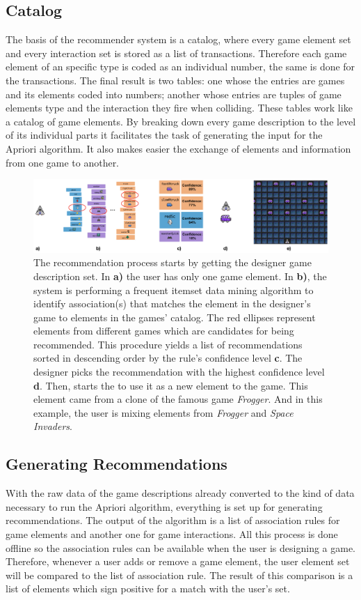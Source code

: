 \documentclass[letterpaper]{article} %
\begin{document}
\subsection{Catalog}
The basis of the recommender system is a catalog, where every game element set and every interaction set is stored as a list of transactions. Therefore each game element of an specific type is coded as an individual number, the same is done for the transactions. The final result is two tables: one whose the entries are games and its elements coded into numbers; another whose entries are tuples of game elements type and the interaction they fire when colliding. These tables work like a catalog of game elements. By breaking down every game description to the level of its individual parts it facilitates the task of generating the input for the Apriori algorithm. It also makes easier the exchange of elements and information from one game to another.

\begin{figure}[ht]
  \includegraphics[width=\linewidth]{process.png}
  \caption{The recommendation process starts by getting the designer game description set. In \textbf{a)} the user has only one game element. In \textbf{b)}, the system is performing a frequent itemset data mining algorithm to identify association(s) that matches the element in the designer's game to elements in the games' catalog. The red ellipses represent elements from different games which are candidates for being recommended. This procedure yields a list of recommendations sorted in descending order by the rule's confidence level \textbf{c}. The designer picks the recommendation with the highest confidence level \textbf{d}. Then, starts the to use it as a new element to the game. This element came from a clone of the famous game \textit{Frogger}. And in this example, the user is mixing elements from \textit{Frogger} and \textit{Space Invaders}.}
  \label{process}
\end{figure}

\subsection{Generating Recommendations}
With the raw data of the game descriptions already converted to the kind of data necessary to run the Apriori algorithm, everything is set up for generating recommendations. The output of the algorithm is a list of association rules for game elements and another one for game interactions. All this process is done offline so the association rules can be available when the user is designing a game. Therefore, whenever a user adds or remove a game element, the user element set will be compared to the list of association rule. The result of this comparison is a list of elements which sign positive for a match with the user's set.
\end{document}
